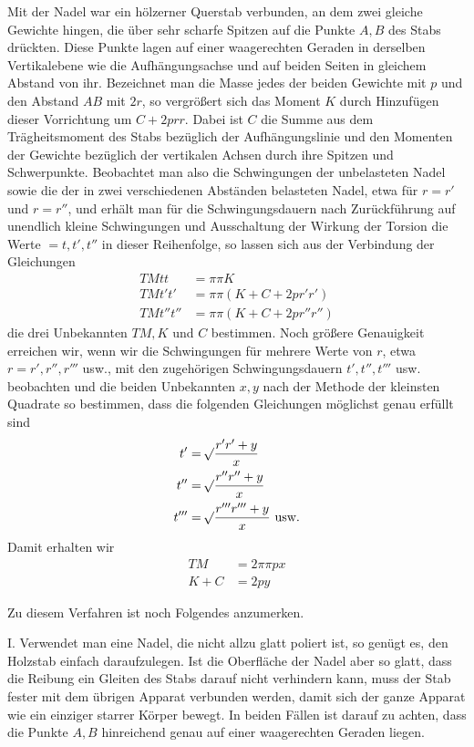 Mit der Nadel war ein hölzerner Querstab verbunden, an dem zwei gleiche Gewichte hingen, die über sehr scharfe Spitzen auf die Punkte $A,B$ des Stabs drückten. Diese Punkte lagen auf einer waagerechten Geraden in derselben Vertikalebene wie die Aufhängungsachse und auf beiden Seiten in gleichem Abstand von ihr. Bezeichnet man die Masse jedes der beiden Gewichte mit $p$ und den Abstand $AB$ mit $2r$, so vergrößert sich das Moment $K$ durch Hinzufügen dieser Vorrichtung um $C+2prr$. Dabei ist $C$ die Summe aus dem Trägheitsmoment des Stabs bezüglich der Aufhängungslinie und den Momenten der Gewichte bezüglich der vertikalen Achsen durch ihre Spitzen und Schwerpunkte. Beobachtet man also die Schwingungen der unbelasteten Nadel sowie die der in zwei verschiedenen Abständen belasteten Nadel, etwa für $r=r'$ und $r=r''$, und erhält man für die Schwingungsdauern nach Zurückführung auf unendlich kleine Schwingungen und Ausschaltung der Wirkung der Torsion die Werte $=t,t',t''$ in dieser Reihenfolge, so lassen sich aus der Verbindung der Gleichungen
\[
\begin{aligned}
TMtt&=\pi\pi K\\
TMt't'&=\pi\pi(K+C+2pr'r')\\
TMt''t''&=\pi\pi(K+C+2pr''r'')
\end{aligned}
\]
die drei Unbekannten $TM,K$ und $C$ bestimmen. Noch größere Genauigkeit erreichen wir, wenn wir die Schwingungen für mehrere Werte von $r$, etwa $r=r',r'',r'''$ usw., mit den zugehörigen Schwingungsdauern $t',t'',t'''$ usw. beobachten und die beiden Unbekannten $x,y$ nach der Methode der kleinsten Quadrate so bestimmen, dass die folgenden Gleichungen möglichst genau erfüllt sind
\[
\begin{aligned}
t'&=\mathord{{}^{}\!\surd}\frac{r'r'+y}{x}\\
t''&=\mathord{{}^{}\!\surd}\frac{r''r''+y}{x}\\
t'''&=\mathord{{}^{}\!\surd}\frac{r'''r'''+y}{x}\ \text{usw.}
\end{aligned}
\]
Damit erhalten wir
\[
\begin{aligned}
TM&=2\pi\pi px\\
K+C&=2py
\end{aligned}
\]

Zu diesem Verfahren ist noch Folgendes anzumerken.

I. Verwendet man eine Nadel, die nicht allzu glatt poliert ist, so genügt es, den Holzstab einfach daraufzulegen. Ist die Oberfläche der Nadel aber so glatt, dass die Reibung ein Gleiten des Stabs darauf nicht verhindern kann, muss der Stab fester mit dem übrigen Apparat verbunden werden, damit sich der ganze Apparat wie ein einziger starrer Körper bewegt. In beiden Fällen ist darauf zu achten, dass die Punkte $A,B$ hinreichend genau auf einer waagerechten Geraden liegen.


